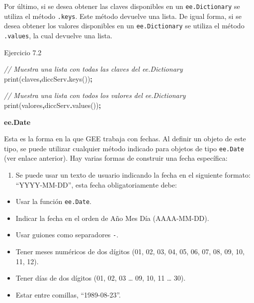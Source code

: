 \documentclass[
  12pt,
  letterpaper,
  twoside]{book}
\newenvironment{Shaded}{\begin{snugshade}}{\end{snugshade}}
\newcommand{\CommentTok}[1]{\textcolor[rgb]{0.56,0.35,0.01}{\textit{#1}}}
\newcommand{\FunctionTok}[1]{\textcolor[rgb]{0.00,0.00,0.00}{#1}}
\newcommand{\NormalTok}[1]{#1}
\newcommand{\OperatorTok}[1]{\textcolor[rgb]{0.81,0.36,0.00}{\textbf{#1}}}
\newcommand{\StringTok}[1]{\textcolor[rgb]{0.31,0.60,0.02}{#1}}
\providecommand{\tightlist}{%
  \setlength{\itemsep}{0pt}\setlength{\parskip}{0pt}}
\begin{document}
Por último, si se desea obtener las claves disponibles en un \texttt{ee.Dictionary} se utiliza el método \texttt{.keys}. Este método devuelve una lista. De igual forma, si se desea obtener los valores disponibles en un \texttt{ee.Dictionary} se utiliza el método \texttt{.values}, la cual devuelve una lista.

Ejercicio 7.2

\begin{Shaded}
\begin{Highlighting}[]
\CommentTok{// Muestra una lista con todas las claves del ee.Dictionary}
\FunctionTok{print}\NormalTok{(}\StringTok{\textquotesingle{}claves\textquotesingle{}}\OperatorTok{,}\NormalTok{diccServ}\OperatorTok{.}\FunctionTok{keys}\NormalTok{())}\OperatorTok{;}    

\CommentTok{// Muestra una lista con todos los valores del ee.Dictionary}
\FunctionTok{print}\NormalTok{(}\StringTok{\textquotesingle{}valores\textquotesingle{}}\OperatorTok{,}\NormalTok{diccServ}\OperatorTok{.}\FunctionTok{values}\NormalTok{())}\OperatorTok{;}  
\end{Highlighting}
\end{Shaded}

\textbf{ee.Date}

Esta es la forma en la que GEE trabaja con fechas. Al definir un objeto de este tipo, se puede utilizar cualquier método indicado para objetos de tipo \texttt{ee.Date} (ver enlace anterior). Hay varias formas de construir una fecha específica:

\begin{enumerate}
\def\labelenumi{\arabic{enumi}.}
\tightlist
\item
  Se puede usar un texto de usuario indicando la fecha en el siguiente formato: ``YYYY-MM-DD'', esta fecha obligatoriamente debe:
\end{enumerate}

\begin{itemize}
\tightlist
\item
  Usar la función \texttt{ee.Date}.
\item
  Indicar la fecha en el orden de Año Mes Día (AAAA-MM-DD).
\item
  Usar guiones como separadores \texttt{-}.
\item
  Tener meses numéricos de dos dígitos (01, 02, 03, 04, 05, 06, 07, 08, 09, 10, 11, 12).
\item
  Tener días de dos dígitos (01, 02, 03 \ldots{} 09, 10, 11 \ldots{} 30).
\item
  Estar entre comillas, ``1989-08-23''.
\end{itemize}
\end{document}
